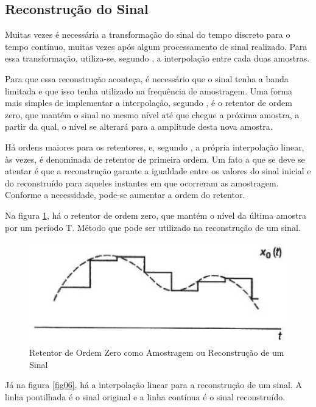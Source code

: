 \subsection{Reconstrução do Sinal}
Muitas vezes é necessária a transformação do sinal do tempo discreto para o tempo contínuo, muitas vezes após algum processamento de sinal realizado. Para essa transformação, utiliza-se, segundo \cite{oppenheim2010sinais}, a interpolação entre cada duas amostras. \par Para que essa reconstrução aconteça, é necessário que o sinal tenha a banda limitada e que isso tenha utilizado na frequência de amostragem. Uma forma mais simples de implementar a interpolação, segundo \cite{oppenheim2010sinais}, é o retentor de ordem zero, que mantém o sinal no mesmo nível até que chegue a próxima amostra, a partir da qual, o nível se alterará para a amplitude desta nova amostra. \par Há ordens maiores para os retentores, e, segundo \cite{oppenheim2010sinais}, a própria interpolação linear, às vezes, é denominada de retentor de primeira ordem. Um fato a que se deve se atentar é que a reconstrução garante a igualdade entre os valores do sinal inicial e do reconstruído para aqueles instantes em que ocorreram as amostragem.  Conforme a necessidade, pode-se aumentar a ordem do retentor.
\par Na figura \ref{fig05}, há o retentor de ordem zero, que mantém o nível da última amostra por um período T. Método que pode ser utilizado na reconstrução de um sinal.

\begin{figure}[h]
	\centering
    \includegraphics[scale=0.4]{figuras/fig05.eps}
	\caption{Retentor de Ordem Zero como Amostragem ou Reconstrução de um Sinal}
	\label{fig05}
\end{figure}

Já na figura \ref{fig06}, há a interpolação linear para a reconstrução de um sinal. A linha pontilhada é o sinal original e a linha contínua é o sinal reconstruído. 

